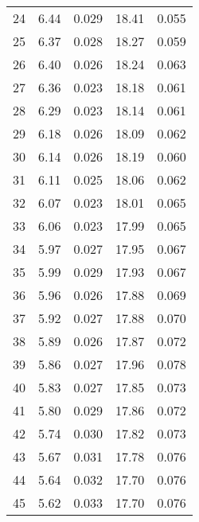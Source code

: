 \begin{table}
\begin{tabular}{c|ll|ll}
24 & 6.44 & 0.029 & 18.41 & 0.055 \\
25 & 6.37 & 0.028 & 18.27 & 0.059 \\
26 & 6.40 & 0.026 & 18.24 & 0.063 \\
27 & 6.36 & 0.023 & 18.18 & 0.061 \\
28 & 6.29 & 0.023 & 18.14 & 0.061 \\
29 & 6.18 & 0.026 & 18.09 & 0.062 \\
30 & 6.14 & 0.026 & 18.19 & 0.060 \\
31 & 6.11 & 0.025 & 18.06 & 0.062 \\
32 & 6.07 & 0.023 & 18.01 & 0.065 \\
33 & 6.06 & 0.023 & 17.99 & 0.065 \\
34 & 5.97 & 0.027 & 17.95 & 0.067 \\
35 & 5.99 & 0.029 & 17.93 & 0.067 \\
36 & 5.96 & 0.026 & 17.88 & 0.069 \\
37 & 5.92 & 0.027 & 17.88 & 0.070 \\
38 & 5.89 & 0.026 & 17.87 & 0.072 \\
39 & 5.86 & 0.027 & 17.96 & 0.078 \\
40 & 5.83 & 0.027 & 17.85 & 0.073 \\
41 & 5.80 & 0.029 & 17.86 & 0.072 \\
42 & 5.74 & 0.030 & 17.82 & 0.073 \\
43 & 5.67 & 0.031 & 17.78 & 0.076 \\
44 & 5.64 & 0.032 & 17.70 & 0.076 \\
45 & 5.62 & 0.033 & 17.70 & 0.076 \\
               \hline
        \end{tabular}
    \end{table}
    \clearpage

